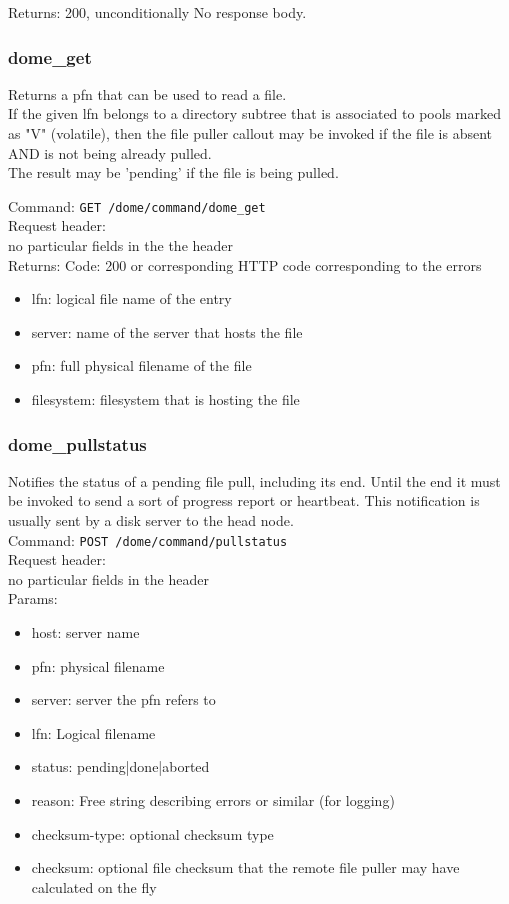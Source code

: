 \documentclass[a4paper,10pt]{scrreprt}
\begin{document}
Returns: 200, unconditionally
No response body.



\subsubsection{dome\_get}
Returns a pfn that can be used to read a file.\\

If the given lfn belongs to a directory subtree that is associated to pools marked as "V" (volatile), then the file puller callout
may be invoked if the file is absent AND is not being already pulled.\\
The result may be 'pending' if the file is being pulled.

Command:
\lstinline"GET /dome/command/dome_get"\\

Request header:\\
no particular fields in the the header\\

Returns:
Code: 200 or corresponding HTTP code corresponding to the errors
\begin{itemize}
 \item lfn: logical file name of the entry
 \item server: name of the server that hosts the file
 \item pfn: full physical filename of the file
 \item filesystem: filesystem that is hosting the file
\end{itemize}

\subsubsection{dome\_pullstatus}
Notifies the status of a pending file pull, including its end. Until the end it must be invoked to send a sort of progress report or heartbeat.
This notification is usually sent by a disk server to the head node.\\

Command:
\lstinline"POST /dome/command/pullstatus"\\

Request header:\\
no particular fields in the header\\

Params:
\begin{itemize}
 \item host: server name
 \item pfn: physical filename
 \item server: server the pfn refers to
 \item lfn: Logical filename
 \item status: pending|done|aborted

 \item reason: Free string describing errors or similar (for logging)
 \item checksum-type: optional checksum type
 \item checksum: optional file checksum that the remote file puller may have calculated on the fly
\end{itemize}
\end{document}

